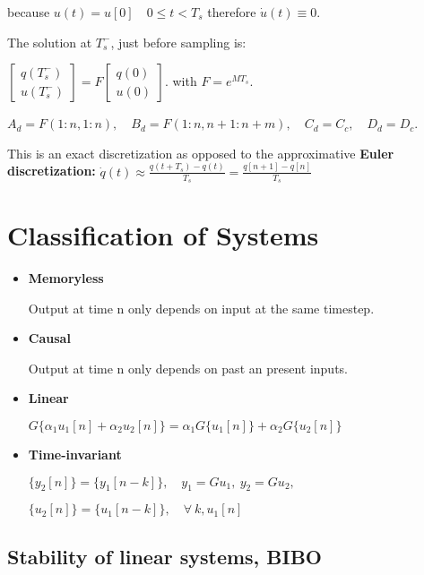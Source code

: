 \documentclass[8pt,a4paper]{scrartcl}
\begin{document}
\begin{multicols*}{3}
because $u(t)=u[0]\quad 0\leq t<T_s$ therefore $\dot{u}(t)\equiv0$.

The solution at $T_s^-$, just before sampling is: 

\begin{center}
$\begin{bmatrix}q(T_s^-)\\u(T_s^-)\end{bmatrix}=F\begin{bmatrix}q(0)\\u(0)\end{bmatrix}$. with $F=e^{MT_s}$.

\finn

$A_d=F(1:n,1:n),\quad B_d=F(1:n,n+1:n+m),\quad C_d=C_c,\quad D_d=D_c$.
\end{center}


This is an exact discretization as opposed to the approximative \textbf{Euler discretization:} $\dot{q}(t)\approx\frac{q(t+T_s)-q(t)}{T_s}=\frac{q[n+1]-q[n]}{T_s}$


\section{Classification of Systems}

\begin{itemize}
\item \textbf{Memoryless}

Output at time n only depends on input at the same timestep.
\item \textbf{Causal}

Output at time n only depends on past an present inputs.
\item \textbf{Linear}

$G\{\alpha_1u_1[n]+\alpha_2u_2[n]\}=\alpha_1G\{u_1[n]\}+\alpha_2G\{u_2[n]\}$
\item \textbf{Time-invariant}

$\{y_2[n]\}=\{y_1[n-k]\},\quad y_1=Gu_1,\ y_2=Gu_2,$

$\{u_2[n]\}=\{u_1[n-k]\},\quad \forall\  k,u_1[n]$
\end{itemize}

\subsection{Stability of linear systems, BIBO}


\end{multicols*}
\end{document}
